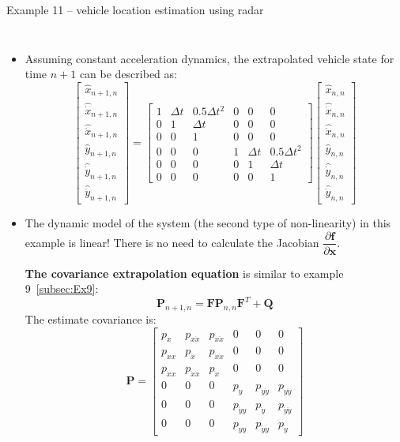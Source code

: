 \begin{frame}{Example 11 – vehicle location estimation using radar}
\begin{columns}
\begin{itemize}
    \item Assuming constant acceleration dynamics, the extrapolated vehicle state for time \(n + 1\) can be described as:
    \vspace{-5pt}
\[\!\!\!\!
\begin{bmatrix}
\hat{x}_{n+1,n} \\
\hat{\dot{x}}_{n+1,n} \\
\hat{\ddot{x}}_{n+1,n} \\
\hat{y}_{n+1,n} \\
\hat{\dot{y}}_{n+1,n} \\
\hat{\ddot{y}}_{n+1,n}
\end{bmatrix}
\!\!=\!\!
\begin{bmatrix}
1 & \Delta t & 0.5\Delta t^2 & 0 & 0 & 0 \\
0 & 1 & \Delta t & 0 & 0 & 0 \\
0 & 0 & 1 & 0 & 0 & 0 \\
0 & 0 & 0 & 1 & \Delta t & 0.5\Delta t^2 \\
0 & 0 & 0 & 0 & 1 & \Delta t \\
0 & 0 & 0 & 0 & 0 & 1
\end{bmatrix}\!\!
\begin{bmatrix}
\hat{x}_{n,n} \\
\hat{\dot{x}}_{n,n} \\
\hat{\ddot{x}}_{n,n} \\
\hat{y}_{n,n} \\
\hat{\dot{y}}_{n,n} \\
\hat{\ddot{y}}_{n,n}
\end{bmatrix}
\]
\vspace{-7pt}
\item The dynamic model of the system (the second type of non-linearity) in this example is linear! There is no need to calculate the Jacobian \(\dfrac{\partial \mathbf{f}}{\partial \mathbf{x}}\).

\textbf{The covariance extrapolation equation} is similar to example 9~\ref{subsec:Ex9}:
\vspace{-7pt}
\[
\mathbf{P}_{n+1,n} = \mathbf{F} \mathbf{P}_{n,n} \mathbf{F}^T + \mathbf{Q}
\]
\vspace{-5pt}
The estimate covariance is:
\vspace{-5pt}
\[
\mathbf{P} =
\begin{bmatrix}
p_{x} & p_{x\dot{x}} & p_{x\ddot{x}} & 0 & 0 & 0 \\
p_{\dot{x}x} & p_{\dot{x}} & p_{\dot{x}\ddot{x}} & 0 & 0 & 0 \\
p_{\ddot{x}x} & p_{\ddot{x}\dot{x}} & p_{\ddot{x}} & 0 & 0 & 0 \\
0 & 0 & 0 & p_{y} & p_{y\dot{y}} & p_{y\ddot{y}} \\
0 & 0 & 0 & p_{\dot{y}y} & p_{\dot{y}} & p_{\dot{y}\ddot{y}} \\
0 & 0 & 0 & p_{\ddot{y}y} & p_{\ddot{y}\dot{y}} & p_{\ddot{y}}
\end{bmatrix}
\]
\end{itemize}
\end{columns}
\end{frame}


